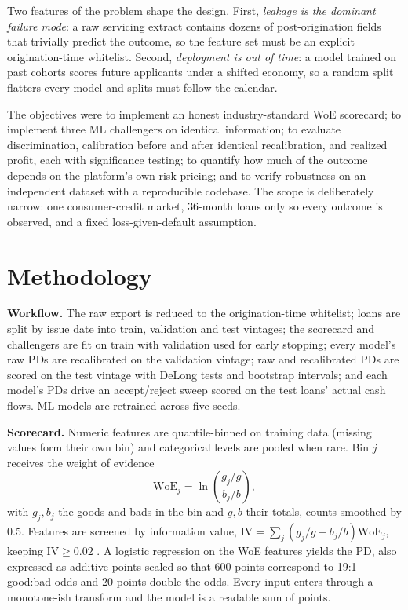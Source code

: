 \documentclass[a4paper,twocolumn,10pt]{article}
\begin{document}
Two features of the problem shape the design. First, \emph{leakage is the dominant failure mode}: a raw servicing extract contains dozens of post-origination fields that trivially predict the outcome, so the feature set must be an explicit origination-time whitelist. Second, \emph{deployment is out of time}: a model trained on past cohorts scores future applicants under a shifted economy, so a random split flatters every model and splits must follow the calendar.

The objectives were to implement an honest industry-standard WoE scorecard; to implement three ML challengers on identical information; to evaluate discrimination, calibration before and after identical recalibration, and realized profit, each with significance testing; to quantify how much of the outcome depends on the platform's own risk pricing; and to verify robustness on an independent dataset with a reproducible codebase. The scope is deliberately narrow: one consumer-credit market, 36-month loans only so every outcome is observed, and a fixed loss-given-default assumption.

\section{Methodology}

\textbf{Workflow.} The raw export is reduced to the origination-time whitelist; loans are split by issue date into train, validation and test vintages; the scorecard and challengers are fit on train with validation used for early stopping; every model's raw PDs are recalibrated on the validation vintage; raw and recalibrated PDs are scored on the test vintage with DeLong tests and bootstrap intervals; and each model's PDs drive an accept/reject sweep scored on the test loans' actual cash flows. ML models are retrained across five seeds.

\textbf{Scorecard.} Numeric features are quantile-binned on training data (missing values form their own bin) and categorical levels are pooled when rare. Bin $j$ receives the weight of evidence
\begin{equation}
\mathrm{WoE}_j=\ln\!\left(\frac{g_j/g}{b_j/b}\right),
\label{eq:woe}
\end{equation}
with $g_j,b_j$ the goods and bads in the bin and $g,b$ their totals, counts smoothed by 0.5. Features are screened by information value, $\mathrm{IV}=\sum_j(g_j/g-b_j/b)\mathrm{WoE}_j$, keeping $\mathrm{IV}\ge0.02$ \cite{siddiqi2006}. A logistic regression on the WoE features yields the PD, also expressed as additive points scaled so that 600 points correspond to 19:1 good:bad odds and 20 points double the odds. Every input enters through a monotone-ish transform and the model is a readable sum of points.
\end{document}
